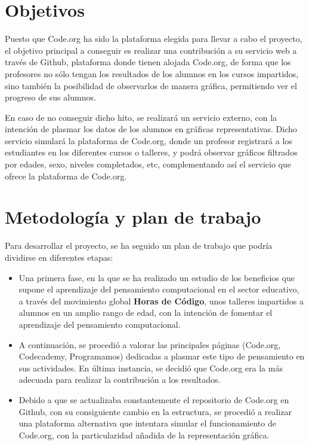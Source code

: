 \section{Objetivos}
\label{1:sec:2}

Puesto que Code.org ha sido la plataforma elegida para llevar a cabo el proyecto, el objetivo principal a conseguir es realizar una contribución a su servicio web a través de Github, plataforma donde tienen alojada Code.org, de forma que los profesores no sólo tengan los resultados de los alumnos en los cursos impartidos, sino también la posibilidad de
observarlos de manera gráfica, permitiendo ver el progreso de sus alumnos.

En caso de no conseguir dicho hito, se realizará un servicio externo, con la intención de plasmar los datos de los alumnos en gráficas representativas. Dicho servicio simulará la plataforma de Code.org, donde un profesor registrará a los estudiantes en los diferentes cursos o talleres, y podrá observar gráficos filtrados por edades, sexo, niveles completados, etc,
complementando así el servicio que ofrece la plataforma de Code.org.

\section{Metodología y plan de trabajo}
\label{1:sec:3}

Para desarrollar el proyecto, se ha seguido un plan de trabajo que podría dividirse en diferentes etapas:

\begin{itemize}
  \item Una primera fase, en la que se ha realizado un estudio de los beneficios que supone el aprendizaje del pensamiento computacional en el sector educativo, a través del movimiento global \textbf{Horas de Código}\cite{HourOfCode}, unos talleres impartidos a alumnos en un amplio rango de edad, con la intención de fomentar el aprendizaje del pensamiento computacional.
  \item A continuación, se procedió a valorar las principales páginas (Code.org, Codecademy, Programamos\cite{Programamos}) dedicadas a plasmar este tipo de pensamiento en sus actividades. En última instancia, se decidió que Code.org era la más adecuada para realizar la contribución a los resultados.
  \item Debido a que se actualizaba constantemente el repositorio de Code.org en Github, con su consiguiente cambio en la estructura, se procedió a realizar una plataforma alternativa que intentara simular el funcionamiento de Code.org, con la particularidad añadida de la representación gráfica.
\end{itemize}

